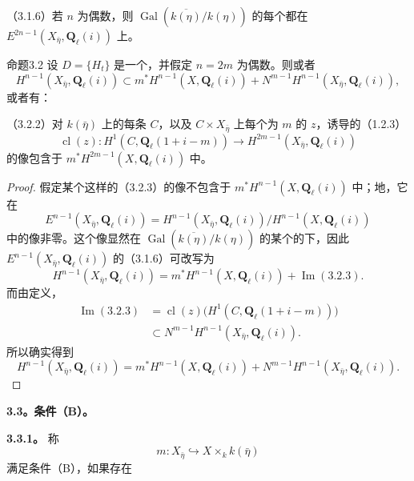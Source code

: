 \noindent（3.1.6）若 $n$ 为偶数，则 $\operatorname{Gal}(\overline{k(\eta)}/k(\eta))$ 的每个都在 $E^{2n-1}(X_{\bar\eta},\mathbf Q_\ell(i))$ 上。

\begin{SGAresult}{命题}{3.2}
设 $D=\{H_t\}$ 是一个，并假定 $n=2m$ 为偶数。则或者
\begin{equation}\tag{3.2.1}
H^{n-1}(X_{\bar\eta},\mathbf Q_\ell(i))\subset m^*H^{n-1}(X,\mathbf Q_\ell(i))+N^{m-1}H^{n-1}(X_{\bar\eta},\mathbf Q_\ell(i)),
\end{equation}
或者有：

\noindent（3.2.2）对 $k(\bar\eta)$ 上的每条 $C$，以及 $C\times X_{\bar\eta}$ 上每个为 $m$ 的 $z$，诱导的（1.2.3）
\begin{equation}\tag{3.2.3}
\operatorname{cl}(z):H^1(C,\mathbf Q_\ell(1+i-m))\longrightarrow H^{2m-1}(X_{\bar\eta},\mathbf Q_\ell(i))
\end{equation}
的像包含于 $m^*H^{2m-1}(X,\mathbf Q_\ell(i))$ 中。
\end{SGAresult}
\begin{proof}
假定某个这样的（3.2.3）的像不包含于 $m^*H^{n-1}(X,\mathbf Q_\ell(i))$ 中；地，它在
\[
E^{n-1}(X_{\bar\eta},\mathbf Q_\ell(i))=H^{n-1}(X_{\bar\eta},\mathbf Q_\ell(i))/H^{n-1}(X,\mathbf Q_\ell(i))
\]
中的像非零。这个像显然在 $\operatorname{Gal}(\overline{k(\eta)}/k(\eta))$ 的某个的下，因此 $E^{n-1}(X_{\bar\eta},\mathbf Q_\ell(i))$ 的（3.1.6）可改写为
\[
H^{n-1}(X_{\bar\eta},\mathbf Q_\ell(i))=m^*H^{n-1}(X,\mathbf Q_\ell(i))+\operatorname{Im}(3.2.3).
\]
而由定义，
\[
\begin{aligned}
\operatorname{Im}(3.2.3)&=\operatorname{cl}(z)\bigl(H^1(C,\mathbf Q_\ell(1+i-m))\bigr)\\
&\subset N^{m-1}H^{n-1}(X_{\bar\eta},\mathbf Q_\ell(i)).
\end{aligned}
\]
所以确实得到
\[
H^{n-1}(X_{\bar\eta},\mathbf Q_\ell(i))=m^*H^{n-1}(X,\mathbf Q_\ell(i))+N^{m-1}H^{n-1}(X_{\bar\eta},\mathbf Q_\ell(i)).
\]
\end{proof}
\textbf{3.3。条件（B）。}

\textbf{3.3.1。} 称
\[m:X_{\bar\eta}\hookrightarrow X\times_k k(\bar\eta)\]
满足条件（B），如果存在

